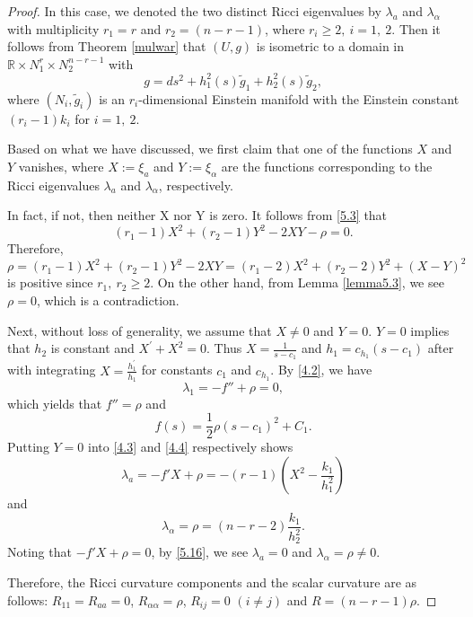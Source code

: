 \documentclass{amsart}
\theoremstyle{definition}
\theoremstyle{remark}
\numberwithin{equation}{section}
\begin{document}
	\begin{proof}
	In this case, we denoted the two distinct Ricci eigenvalues by $\lambda_a$ and $\lambda_\alpha$ 
	with multiplicity $r_1=r$ and $r_2=(n-r-1)$, where $r_i\geq2,\ i=1,\ 2$. 
	Then it follows from Theorem \ref{mulwar} that 
	$(U,g)$ is isometric to a domain in 
	$\mathbb{R}\times N^{r}_1 \times N^{n-r-1}_2$
	with
	\[
     g= ds^2 + h^2_1(s)\tilde{g}_{1}+h^2_{2}(s) \tilde{g}_{2}, 
	\]
	where $(N_i, \tilde{g}_{i})$ is an $r_i$-dimensional Einstein manifold 
	with the Einstein constant $(r_i-1)k_i$ for $i=1,\ 2$.
	
Based on what we have discussed,  we first claim that one of the functions $X$ and $Y$ vanishes,
where $X:=\xi_a$ and $Y:=\xi_\alpha$ are the functions corresponding to the Ricci eigenvalues 
$\lambda_a$ and $\lambda_\alpha$, respectively.

In fact, if not, then neither X nor Y is zero. It follows from \eqref{5.3} that
		\[
		(r_1-1)X^2+(r_2-1)Y^2-2XY-\rho=0.
		\]
		Therefore,
		\[
		\rho=(r_1-1)X^2+(r_2-1)Y^2-2XY=(r_1-2)X^2+(r_2-2)Y^2+(X-Y)^2
		\]
		is positive since $r_1,~r_2\geq2$.
		On the other hand, from Lemma \ref{lemma5.3}, we see $\rho=0$,
		which is a contradiction.
	
	 Next, without loss of generality, we assume that $X\neq0$ and $Y=0$.
	$Y=0$ implies that $h_2$ is constant and $X^{'} + X^2=0$. Thus $X= \frac{1}{s-c_1}$ and 
	$h_1= c_{h_1} (s-c_1)$ after with integrating $X= \frac{h^{'}_1}{h_1}$ for constants $c_1$ and $c_{h_1}$.
	By \eqref{4.2}, we have
	\[
	\lambda_1=-f''+\rho=0,
	\]
	which yields that $f''=\rho$ and
	\[
	f(s) = \frac{1}{2} \rho (s-c_1)^2+C_1.
	\]
	Putting $Y=0$ into \eqref{4.3} and \eqref{4.4} respectively shows
	\begin{equation}\label{5.16}
	\lambda_a=-f'X+\rho=-(r-1)(X^2-\frac{k_1}{h^2_1} )
	\end{equation}
	and
    \[
   \lambda_\alpha=\rho=(n-r-2)\frac{k_1}{h^2_2}.
    \]
	Noting that $-f'X+\rho=0$, by \eqref{5.16}, we see $\lambda_a=0$
	and $\lambda_\alpha=\rho\neq0$. 
	
	Therefore, the Ricci curvature components and the scalar curvature are as follows:
	$R_{11} = R_{aa} =0$,
	$R_{\alpha\alpha}=\rho$, $R_{ij} =0$ 
	$(i \neq j)$ and 
	$R= (n-r-1)\rho $.
	

\end{proof}
\end{document}
